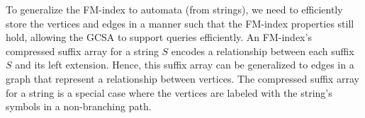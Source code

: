 



To generalize the FM-index to automata (from strings), we need to efficiently store the vertices and edges in a manner such that the FM-index properties still hold, allowing the GCSA to support queries efficiently.  An FM-index's compressed suffix array for a string $S$ encodes a relationship between each suffix $S$ and its left extension.  Hence, this suffix array can be generalized to edges in a graph that represent a relationship between vertices.  The compressed suffix array for a string is a special case where the vertices are labeled with the string's symbols in a non-branching path. %

